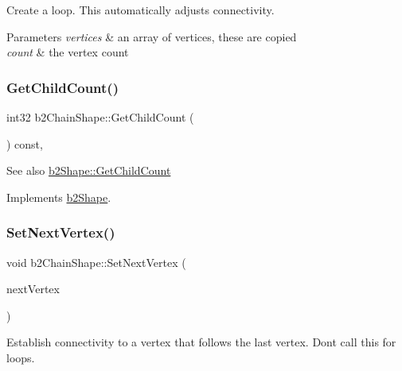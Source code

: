 Create a loop. This automatically adjusts connectivity. 
\begin{DoxyParams}{Parameters}
{\em vertices} & an array of vertices, these are copied \\
\hline
{\em count} & the vertex count \\
\hline
\end{DoxyParams}
\mbox{\label{classb2ChainShape_a4d4fd8f5386a30f35b10d1b2848dbe54}} 
\subsubsection{\texorpdfstring{Get\+Child\+Count()}{GetChildCount()}}
{\footnotesize\ttfamily int32 b2\+Chain\+Shape\+::\+Get\+Child\+Count (\begin{DoxyParamCaption}{ }\end{DoxyParamCaption}) const\hspace{0.3cm}{\ttfamily [override]}, {\ttfamily [virtual]}}

\begin{DoxySeeAlso}{See also}
\mbox{\hyperlink{classb2Shape_a05a3c445017d96df9238ceefe6ce37ab}{b2\+Shape\+::\+Get\+Child\+Count}} 
\end{DoxySeeAlso}


Implements \mbox{\hyperlink{classb2Shape_a05a3c445017d96df9238ceefe6ce37ab}{b2\+Shape}}.

\mbox{\label{classb2ChainShape_a15c7c2821a52266ef57621ac7d34a95f}} 
\subsubsection{\texorpdfstring{Set\+Next\+Vertex()}{SetNextVertex()}}
{\footnotesize\ttfamily void b2\+Chain\+Shape\+::\+Set\+Next\+Vertex (\begin{DoxyParamCaption}\item[{const \mbox{\hyperlink{structb2Vec2}{b2\+Vec2}} \&}]{next\+Vertex }\end{DoxyParamCaption})}

Establish connectivity to a vertex that follows the last vertex. Don\textquotesingle{}t call this for loops. \mbox{\label{classb2ChainShape_aeb2ddbe0c52a98885e91b7c8f597315b}} 

